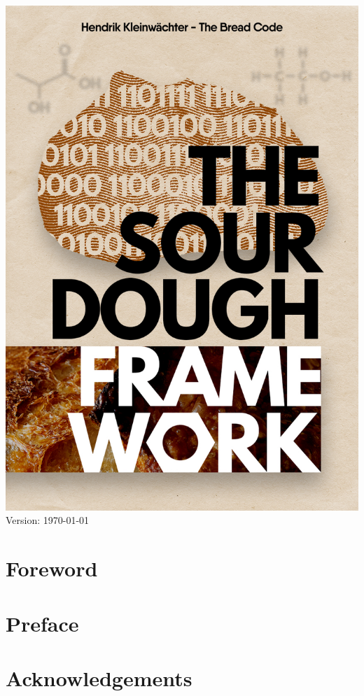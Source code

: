 \documentclass[a4paper, 12pt]{book}
\begin{document}
\begin{titlepage}
	\centering
  \includegraphics[width=\textwidth]{cover-page}
  Version:
  \today
\end{titlepage}


\frontmatter

\tableofcontents

\chapter{Foreword}


\chapter{Preface}


\chapter{Acknowledgements}

\end{document}
